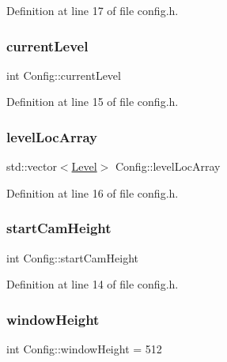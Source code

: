 Definition at line 17 of file config.\+h.

\hypertarget{class_config_ad8469bc162d05e0d33da9599ba22ad1c}{}\label{class_config_ad8469bc162d05e0d33da9599ba22ad1c} 
\subsubsection{\texorpdfstring{current\+Level}{currentLevel}}
{\footnotesize\ttfamily int Config\+::current\+Level}



Definition at line 15 of file config.\+h.

\hypertarget{class_config_a5aaeed24d7b392df4a548ce24d2be7d6}{}\label{class_config_a5aaeed24d7b392df4a548ce24d2be7d6} 
\subsubsection{\texorpdfstring{level\+Loc\+Array}{levelLocArray}}
{\footnotesize\ttfamily std\+::vector$<$\hyperlink{class_level}{Level}$>$ Config\+::level\+Loc\+Array}



Definition at line 16 of file config.\+h.

\hypertarget{class_config_a191a4461e0889485ae73f696cd3dfd3d}{}\label{class_config_a191a4461e0889485ae73f696cd3dfd3d} 
\subsubsection{\texorpdfstring{start\+Cam\+Height}{startCamHeight}}
{\footnotesize\ttfamily int Config\+::start\+Cam\+Height}



Definition at line 14 of file config.\+h.

\hypertarget{class_config_a88bb54f15c2bd07b9d8b65d45d5c6997}{}\label{class_config_a88bb54f15c2bd07b9d8b65d45d5c6997} 
\subsubsection{\texorpdfstring{window\+Height}{windowHeight}}
{\footnotesize\ttfamily int Config\+::window\+Height = 512}



